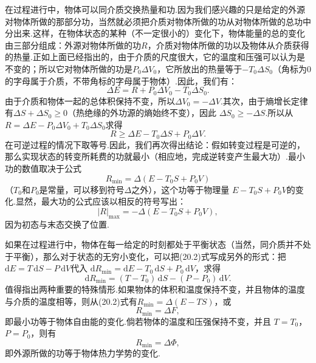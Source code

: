 在过程进行中，物体可以同介质交换热量和功.因为我们感兴趣的只是给定的外源对物体所做的那部分功，当然就必须把介质对物体所做的功从对物体所做的总功中分出来.这样，在物体状态的某种（不一定很小的）变化下，物体能量的总的变化由三部分组成：外源对物体所做的功$R$，介质对物体所做的功以及物体从介质获得的热量.正如上面已经指出的，由于介质的尺度很大，它的温度和压强可以认为是不变的；所以它对物体所做的功是$P_0\Delta V_0$，它所放出的热量等于$-T_0\Delta S_0$（角标为0的字母属于介质，不带角标的字母属于物体）.因此，我们有：
\begin{equation*}
  \Delta E=R+P_0\Delta V_0-T_0\Delta S_0.
\end{equation*}
由于介质和物体一起的总体积保持不变，所以$\Delta V_0=-\Delta V$.其次，由于熵增长定律有$\Delta S+\Delta S_0\geqslant0$（热绝缘的外功源的熵始终不变），因此
$\Delta S_0\geqslant-\Delta S$.所以从
$R=\Delta E-P_0\Delta V_0+T_0\Delta S_0$求得
\begin{equation}
  R\geqslant\Delta E-T_0\Delta S+P_0\Delta V.
\end{equation}
在可逆过程的情况下取等号.因此，我们再次得出结论：假如转变过程是可逆的，那么实现状态的转变所耗费的功就最小（相应地，完成逆转变产生最大功）.最小功的数值取决于公式
\begin{equation}
  R_{\min}=\Delta(E-T_0S+P_0V)
\end{equation}
（$T_0$和$P_0$是常量，可以移到符号$\Delta$之外），这个功等于物理量
$E-T_0S+P_0V$的变化.显然，最大功的公式应该以相反的符号写出：
\begin{equation}
  |R|_{\max}=-\Delta(E-T_0S+P_0V),
\end{equation}
因为初态与末态交换了位置.

如果在过程进行中，物体在每一给定的时刻都处于平衡状态（当然，同介质并不处于平衡），那么对于状态的无穷小变化，可以把(20.2)式写成另外的形式：把
$\mathrm{d}E=T\,\mathrm{d}S-P\,\mathrm{d}V$代入
$\mathrm{d}R_{\min}=\mathrm{d}E-T_0\,\mathrm{d}S+P_0\,\mathrm{d}V$，求得
\begin{equation}
  \mathrm{d}R_{\min}=(T-T_0)\,\mathrm{d}S-(P-P_0)\,\mathrm{d}V.
\end{equation}
值得指出两种重要的特殊情形.如果物体的体积和温度保持不变，并且物体的温度与介质的温度相等，则从(20.2)式有$R_{\min}=\Delta(E-TS)$，或
\begin{equation}
  R_{\min}=\Delta F,
\end{equation}
即最小功等于物体自由能的变化.倘若物体的温度和压强保持不变，并且
$T=T_0$，$P=P_0$，则有
\begin{equation}
  R_{\min}=\Delta\varPhi,
\end{equation}
即外源所做的功等于物体热力学势的变化.

